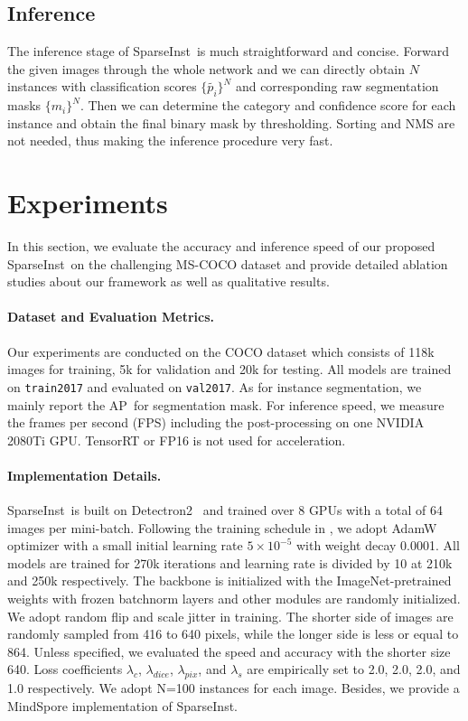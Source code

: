 \documentclass[10pt,twocolumn,letterpaper]{article}
\newcommand{\name}{SparseInst}
\newcommand{\apm}{AP}
\begin{document}
\subsection{Inference}
The inference stage of \name~is much straightforward and concise. Forward the given images through the whole network and we can directly obtain $N$ instances with classification scores $\{\tilde{p_i}\}^N$ and corresponding raw segmentation masks $\{m_i\}^N$. Then we can determine the category and confidence score for each instance and obtain the final binary mask by thresholding. Sorting and NMS are not needed, thus making the inference procedure very fast.


\section{Experiments}
\label{expr}
In this section, we evaluate the accuracy and inference speed of our proposed \name~on the challenging MS-COCO dataset and provide detailed ablation studies about our framework as well as qualitative results.

\paragraph{Dataset and Evaluation Metrics.} Our experiments are conducted on the COCO dataset \cite{COCOLinMBHPRDZ14} which consists of 118k images for training, 5k for validation and 20k for testing.
All models are trained on \texttt{train2017} and evaluated on \texttt{val2017}. As for instance segmentation, we mainly report the \apm~for segmentation mask. For inference speed, we measure the frames per second (FPS) including the post-processing on one NVIDIA 2080Ti GPU.
TensorRT or FP16 is not used for acceleration.

\paragraph{Implementation Details.}
\label{expr_details}
\name~is built on  Detectron2~\cite{wu2019detectron2} and trained over 8 GPUs with a total of 64 images per mini-batch. Following the training schedule in \cite{peize2020onenet}, we adopt AdamW~\cite{LoshchilovH19} optimizer with a small initial learning rate $5\times10^{-5}$ with weight decay 0.0001. All models are trained for 270k iterations and learning rate is divided by 10 at 210k and 250k respectively. The backbone is initialized with the ImageNet-pretrained weights with frozen batchnorm layers and other modules are randomly initialized. We adopt random flip and scale jitter in training. The shorter side of images are randomly sampled from 416 to 640 pixels, while the longer side is less or equal to 864. Unless specified, we evaluated the speed and accuracy with the shorter size 640. Loss coefficients $\lambda_c$, $\lambda_{dice}$, $\lambda_{pix}$, and $\lambda_{s}$ are empirically set to 2.0, 2.0, 2.0, and 1.0 respectively. We adopt N=100 instances for each image. Besides, we provide a MindSpore \cite{mindspore} implementation of \name{}.
\end{document}
